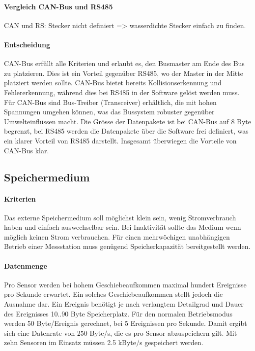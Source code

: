 \paragraph{Vergleich CAN-Bus und RS485}
CAN und RS: Stecker nicht definiert => wasserdichte Stecker einfach zu finden.

\paragraph{Entscheidung}
CAN-Bus erfüllt alle Kriterien und erlaubt es, den Busmaster am Ende des Bus zu platzieren. Dies ist ein Vorteil gegenüber RS485, wo der Master in der Mitte platziert werden sollte. CAN-Bus bietet bereits Kollisionserkennung und Fehlererkennung, während dies bei RS485 in der Software gelöst werden muss. Für CAN-Bus sind Bus-Treiber (Transceiver) erhältlich, die mit hohen Spannungen umgehen können, was das Bussystem robuster gegenüber Umwelteinflüssen macht. Die Grösse der Datenpakete ist bei CAN-Bus auf 8 Byte begrenzt, bei RS485 werden die Datenpakete über die Software frei definiert, was ein klarer Vorteil von RS485 darstellt. Insgesamt überwiegen die Vorteile von CAN-Bus klar. 



\subsection{Speichermedium}
\paragraph{Kriterien} Das externe Speichermedium soll möglichst klein sein, wenig Stromverbrauch haben und einfach auswechselbar sein. Bei Inaktivität sollte das Medium wenn möglich keinen Strom verbrauchen. Für einen mehrwöchigen unabhängigen Betrieb einer Messstation muss genügend Speicherkapazität bereitgestellt werden.

\paragraph{Datenmenge} Pro Sensor werden bei hohem Geschiebeaufkommen maximal hundert Ereignisse pro Sekunde erwartet. Ein solches Geschiebeaufkommen stellt jedoch die Ausnahme dar. Ein Ereignis benötigt je nach verlangtem Detailgrad und Dauer des Ereignisses 10..90 Byte Speicherplatz. Für den normalen Betriebsmodus werden 50 Byte/Ereignis gerechnet, bei 5 Ereignissen pro Sekunde. Damit ergibt sich eine Datenrate von 250 Byte/s, die es pro Sensor abzuspeichern gilt. Mit zehn Sensoren im Einsatz müssen 2.5 kByte/s gespeichert werden. 


